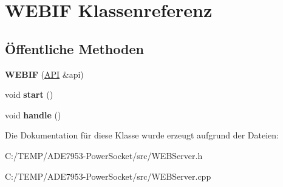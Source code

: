 \hypertarget{class_w_e_b_i_f}{}\section{W\+E\+B\+IF Klassenreferenz}
\label{class_w_e_b_i_f}
\subsection*{Öffentliche Methoden}
\begin{DoxyCompactItemize}
\item 
\mbox{\label{class_w_e_b_i_f_a8717e0a1ac2c54e3019c23decd22a94d}} 
{\bfseries W\+E\+B\+IF} (\hyperlink{class_a_p_i}{A\+PI} \&api)
\item 
\mbox{\label{class_w_e_b_i_f_a489fe1efb217ecedfe5391c71e9f8b4c}} 
void {\bfseries start} ()
\item 
\mbox{\label{class_w_e_b_i_f_a88fc15cda66431436ea0de38a0d4c734}} 
void {\bfseries handle} ()
\end{DoxyCompactItemize}


Die Dokumentation für diese Klasse wurde erzeugt aufgrund der Dateien\+:\begin{DoxyCompactItemize}
\item 
C\+:/\+T\+E\+M\+P/\+A\+D\+E7953-\/\+Power\+Socket/src/W\+E\+B\+Server.\+h\item 
C\+:/\+T\+E\+M\+P/\+A\+D\+E7953-\/\+Power\+Socket/src/W\+E\+B\+Server.\+cpp\end{DoxyCompactItemize}
